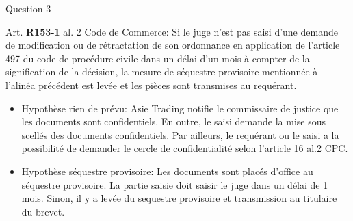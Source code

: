 





\begin{frame}{Question 3}

\begin{block}{}
Art. \textbf{R153-1} al. 2 Code de Commerce: Si le juge n'est pas saisi d'une demande
 de modification ou de rétractation 
de son ordonnance en application de l'article 497 du code de procédure civile 
dans un délai d'un mois à compter de la signification de la décision, 
la mesure de séquestre provisoire mentionnée à l'alinéa précédent est levée 
et les pièces sont transmises au requérant.
\end{block}

\begin{itemize}
    \item Hypothèse rien de prévu: Asie Trading notifie le commissaire
    de justice que les documents sont confidentiels. En outre,
    le saisi demande la mise sous scellés des documents confidentiels.
    Par ailleurs,
    le requérant ou le saisi a la possibilité de demander le cercle de confidentialité
    selon l'article 16 al.2 CPC.
    \item Hypothèse séquestre provisoire: Les documents
    sont placés d'office au séquestre provisoire. La partie saisie doit saisir 
    le juge dans un délai de 1 mois.
    Sinon, il y a levée du sequestre provisoire et transmission au titulaire
    du brevet.
\end{itemize}

\end{frame}
